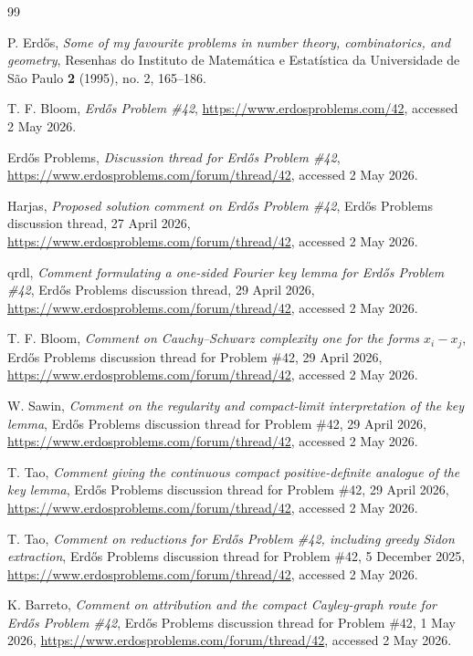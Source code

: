 \documentclass[11pt]{article}
\numberwithin{equation}{section}
\newcommand{\1}{\mathbf 1}
\begin{document}
\begin{thebibliography}{99}

P. Erd\H{o}s,
\emph{Some of my favourite problems in number theory, combinatorics, and geometry},
Resenhas do Instituto de Matem\'atica e Estat\'istica da Universidade de S\~ao Paulo
\textbf{2} (1995), no. 2, 165--186.

T. F. Bloom,
\emph{Erd\H{o}s Problem \#42},
\url{https://www.erdosproblems.com/42},
accessed 2 May 2026.

Erd\H{o}s Problems,
\emph{Discussion thread for Erd\H{o}s Problem \#42},
\url{https://www.erdosproblems.com/forum/thread/42},
accessed 2 May 2026.

Harjas,
\emph{Proposed solution comment on Erd\H{o}s Problem \#42},
Erd\H{o}s Problems discussion thread, 27 April 2026,
\url{https://www.erdosproblems.com/forum/thread/42},
accessed 2 May 2026.

qrdl,
\emph{Comment formulating a one-sided Fourier key lemma for Erd\H{o}s Problem \#42},
Erd\H{o}s Problems discussion thread, 29 April 2026,
\url{https://www.erdosproblems.com/forum/thread/42},
accessed 2 May 2026.

T. F. Bloom,
\emph{Comment on Cauchy--Schwarz complexity one for the forms \(x_i-x_j\)},
Erd\H{o}s Problems discussion thread for Problem \#42, 29 April 2026,
\url{https://www.erdosproblems.com/forum/thread/42},
accessed 2 May 2026.

W. Sawin,
\emph{Comment on the regularity and compact-limit interpretation of the key lemma},
Erd\H{o}s Problems discussion thread for Problem \#42, 29 April 2026,
\url{https://www.erdosproblems.com/forum/thread/42},
accessed 2 May 2026.

T. Tao,
\emph{Comment giving the continuous compact positive-definite analogue of the key lemma},
Erd\H{o}s Problems discussion thread for Problem \#42, 29 April 2026,
\url{https://www.erdosproblems.com/forum/thread/42},
accessed 2 May 2026.

T. Tao,
\emph{Comment on reductions for Erd\H{o}s Problem \#42, including greedy Sidon extraction},
Erd\H{o}s Problems discussion thread for Problem \#42, 5 December 2025,
\url{https://www.erdosproblems.com/forum/thread/42},
accessed 2 May 2026.

K. Barreto,
\emph{Comment on attribution and the compact Cayley-graph route for Erd\H{o}s Problem \#42},
Erd\H{o}s Problems discussion thread for Problem \#42, 1 May 2026,
\url{https://www.erdosproblems.com/forum/thread/42},
accessed 2 May 2026.


\end{thebibliography}
\end{document}
